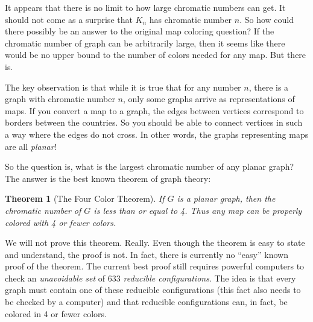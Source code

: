 \documentclass[10pt,]{book}
\theoremstyle{plain}
\newtheorem{theorem}{Theorem}[section]
\theoremstyle{definition}
\theoremstyle{definition}
\theoremstyle{definition}
\theoremstyle{definition}
\numberwithin{equation}{chapter}
\begin{document}
\hypertarget{p-313}{}%
It appears that there is no limit to how large chromatic numbers can get. It should not come as a surprise that \(K_n\) has chromatic number \(n\). So how could there possibly be an answer to the original map coloring question? If the chromatic number of graph can be arbitrarily large, then it seems like there would be no upper bound to the number of colors needed for any map. But there is.%
\par
\hypertarget{p-314}{}%
The key observation is that while it is true that for any number \(n\), there is a graph with chromatic number \(n\), only some graphs arrive as representations of maps. If you convert a map to a graph, the edges between vertices correspond to borders between the countries. So you should be able to connect vertices in such a way where the edges do not cross. In other words, the graphs representing maps are all \emph{planar}!%
\par
\hypertarget{p-315}{}%
So the question is, what is the largest chromatic number of any planar graph? The answer is the best known theorem of graph theory:%
\begin{theorem}[{The Four Color Theorem}]\label{theorem-6}
\hypertarget{p-316}{}%
 If \(G\) is a planar graph, then the chromatic number of \(G\) is less than or equal to 4. Thus any map can be properly colored with 4 or fewer colors.%
\end{theorem}
\hypertarget{p-317}{}%
We will not prove this theorem. Really. Even though the theorem is easy to state and understand, the proof is not. In fact, there is currently no ``easy'' known proof of the theorem. The current best proof still requires powerful computers to check an \emph{unavoidable set} of 633 \emph{reducible configurations}. The idea is that every graph must contain one of these reducible configurations (this fact also needs to be checked by a computer) and that reducible configurations can, in fact, be colored in 4 or fewer colors.%
\typeout{************************************************}
\typeout{************************************************}
\end{document}
